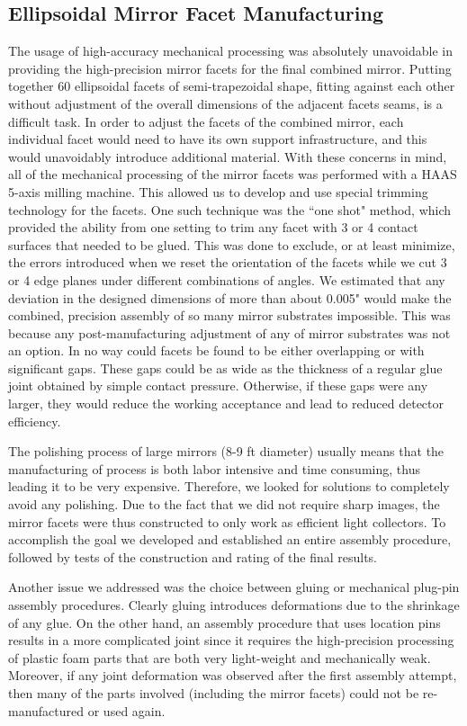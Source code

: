 \subsection {Ellipsoidal Mirror Facet Manufacturing}
The usage of high-accuracy mechanical processing was absolutely unavoidable in providing the high-precision mirror facets for the final combined mirror. Putting together 60 ellipsoidal facets of semi-trapezoidal shape, fitting against each other without adjustment of the overall dimensions of the adjacent facets seams, is a difficult task. In order to adjust the facets of the combined mirror, each individual facet would need to have its own support infrastructure, and this would unavoidably introduce additional material. With these concerns in mind, all of the mechanical processing of the mirror facets was performed with a HAAS 5-axis milling machine. This allowed us to develop and use special trimming technology for the facets. One such technique was the ``one shot" method, which provided the ability from one setting to trim any facet with 3 or 4 contact surfaces that needed to be glued. This was done to exclude, or at least minimize, the errors introduced when we reset the orientation of the facets while we cut 3 or 4 edge planes under different combinations of angles. We estimated that any deviation in the designed dimensions of more than about 0.005" would make the combined, precision assembly of so many mirror substrates impossible. This was because any post-manufacturing adjustment of any of mirror substrates was not an option. In no way could facets be found to be either overlapping or with significant gaps. These gaps could be as wide as the thickness of a regular glue joint obtained by simple contact pressure. Otherwise, if these gaps were any larger, they would reduce the working acceptance and lead to reduced detector efficiency.

The polishing process of large mirrors (8-9 ft diameter) usually means that the manufacturing of process is both labor intensive and time consuming, thus leading it to be very expensive. Therefore, we looked for solutions to completely avoid any polishing. Due to the fact that we did not require sharp images, the mirror facets were thus constructed to only work as efficient light collectors. To accomplish the goal we developed and established an entire assembly procedure, followed by tests of the construction and rating of the final results.

Another issue we addressed was the choice between gluing or mechanical plug-pin assembly procedures. Clearly gluing introduces deformations due to the shrinkage of any glue. On the other hand, an assembly procedure that uses location pins results in a more complicated joint since it requires the high-precision processing of plastic foam parts that are both very light-weight and mechanically weak. Moreover, if any joint deformation was observed after the first assembly attempt, then many of the parts involved (including the mirror facets) could not be re-manufactured or used again.

